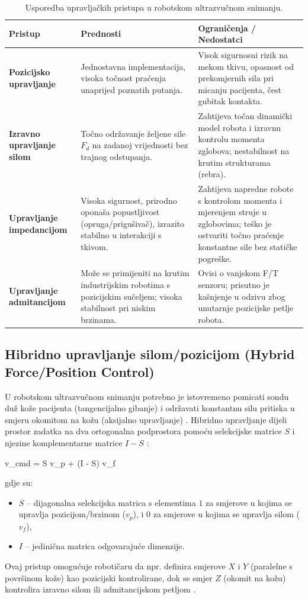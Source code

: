 \begin{table}[H]
\centering
\caption{Usporedba upravljačkih pristupa u robotskom ultrazvučnom snimanju.}
\label{tab:usporedba_upravljanja}
\begin{tabularx}{\textwidth}{p{} X X}
\toprule
\textbf{Pristup} & \textbf{Prednosti} & \textbf{Ograničenja / Nedostatci} \\
\midrule
\textbf{Pozicijsko upravljanje} & Jednostavna implementacija, visoka točnost praćenja unaprijed poznatih putanja. & Visok sigurnosni rizik na mekom tkivu, opasnost od prekomjernih sila pri micanju pacijenta, čest gubitak kontakta. \\
\textbf{Izravno upravljanje silom} & Točno održavanje željene sile $F_d$ na zadanoj vrijednosti bez trajnog odstupanja. & Zahtijeva točan dinamički model robota i izravnu kontrolu momenta zglobova; nestabilnost na krutim strukturama (rebra). \\
\textbf{Upravljanje impedancijom} & Visoka sigurnost, prirodno oponaša popustljivost (opruga/prigušivač), izrazito stabilno u interakciji s tkivom. & Zahtijeva napredne robote s kontrolom momenta i mjerenjem struje u zglobovima; teško je ostvariti točno praćenje konstantne sile bez statičke pogreške. \\
\textbf{Upravljanje admitancijom} & Može se primijeniti na krutim industrijskim robotima s pozicijskim sučeljem; visoka stabilnost pri niskim brzinama. & Ovisi o vanjskom F/T senzoru; prisutno je kašnjenje u odzivu zbog unutarnje pozicijske petlje robota. \\
\bottomrule
\end{tabularx}
\end{table}

\subsection{Hibridno upravljanje silom/pozicijom (Hybrid Force/Position Control)}
U robotskom ultrazvučnom snimanju potrebno je istovremeno pomicati sondu duž kože pacijenta (tangencijalno gibanje) i održavati konstantnu silu pritiska u smjeru okomitom na kožu (aksijalno upravljanje) \cite{sciencedirect2025hybrid}. Hibridno upravljanje dijeli prostor zadatka na dva ortogonalna podprostora pomoću selekcijske matrice $S$ i njezine komplementarne matrice $I - S$ \cite{raghavv2022autonomous, ieee2023full}:
\begin{equation{}}
    v_{cmd} = S v_p + (I - S) v_f
\label{eq:hybrid}
\end{equation{}}
gdje su:
\begin{itemize}
    \item $S$ -- dijagonalna selekcijska matrica s elementima $1$ za smjerove u kojima se upravlja pozicijom/brzinom ($v_p$), i $0$ za smjerove u kojima se upravlja silom ($v_f$),
    \item $I$ -- jedinična matrica odgovarajuće dimenzije.
\end{itemize}
Ovaj pristup omogućuje robotičaru da npr. definira smjerove $X$ i $Y$ (paralelne s površinom kože) kao pozicijski kontrolirane, dok se smjer $Z$ (okomit na kožu) kontrolira izravno silom ili admitancijskom petljom \cite{ieee2025cascaded, li2026robotic}.

